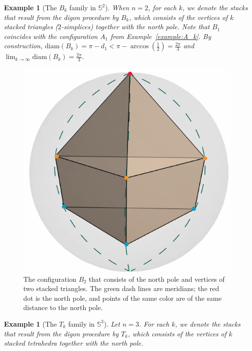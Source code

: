 \documentclass[12pt]{amsart}
\theoremstyle{plain}
\newtheorem{example}[theorem]{Example}
\newcommand{\Sp}{\mathbb{S}}
\newcommand{\diam}{\mathrm{diam}}
\numberwithin{equation}{section}
\begin{document}
\begin{example}[The $B_k$ family in $\Sp^2$]\label{example:B_k}
When $n=2$, for each $k$, we denote the stacks that result from the
digon procedure by $B_k$, which consists of the vertices of $k$
stacked triangles ($2$-simplices) together with the north pole. Note
that $B_1$ coincides with the configuration $A_1$ from
Example~\ref{example:A_k}.  By construction,
  $\diam(B_k) = \pi - d_1 < \pi - \arccos(\frac{1}{2}) =
  \frac{2\pi}{3}$ and $\lim_{k\rightarrow \infty} \diam(B_k) =
  \frac{2\pi}{3}$.
\end{example}

	
	

\begin{figure}[H]
	\centering
	\includegraphics[scale=0.4]{./figures/small_B2.pdf}
	\caption{The configuration $B_2$ that consists of the north pole and vertices of two stacked triangles. The green dash lines are meridians; the red dot is the north pole, and points of the same color are of the same distance to the north pole.}
\end{figure}

\begin{example}[The $T_k$ family in $\Sp^3$]\label{example:T_k}
Let $n=3$.  For each $k$, we denote the stacks that result from the
digon procedure by $T_k$, which consists of the vertices of $k$
stacked tetrahedra together with the north pole.
\end{example}
\end{document}
